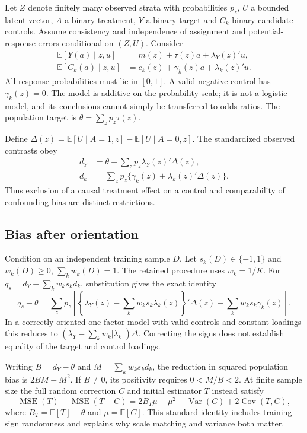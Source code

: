 \documentclass[11pt,a4paper]{article}
\newcommand{\E}{\mathbb E}
\newcommand{\Var}{\operatorname{Var}}
\newcommand{\Cov}{\operatorname{Cov}}
\newcommand{\MSE}{\operatorname{MSE}}
\begin{document}
Let $Z$ denote finitely many observed strata with probabilities $p_z$, $U$ a bounded latent vector, $A$ a binary treatment, $Y$ a binary target and $C_k$ binary candidate controls. Assume consistency and independence of assignment and potential-response errors conditional on $(Z,U)$. Consider
\begin{align}
 \E[Y(a)\mid z,u]&=m(z)+\tau(z)a+\lambda_Y(z)'u,\\
 \E[C_k(a)\mid z,u]&=c_k(z)+\gamma_k(z)a+\lambda_k(z)'u.
\end{align}
All response probabilities must lie in $[0,1]$. A valid negative control has $\gamma_k(z)=0$. The model is additive on the probability scale; it is not a logistic model, and its conclusions cannot simply be transferred to odds ratios. The population target is $\theta=\sum_zp_z\tau(z)$.

Define $\Delta(z)=\E[U\mid A=1,z]-\E[U\mid A=0,z]$. The standardized observed contrasts obey
\begin{align}
 d_Y&=\theta+\sum_zp_z\lambda_Y(z)'\Delta(z),\\
 d_k&=\sum_zp_z\{\gamma_k(z)+\lambda_k(z)'\Delta(z)\}.
\end{align}
Thus exclusion of a causal treatment effect on a control and comparability of confounding bias are distinct restrictions.

\subsection{Bias after orientation}

Condition on an independent training sample $D$. Let $s_k(D)\in\{-1,1\}$ and $w_k(D)\ge0$, $\sum_kw_k(D)=1$. The retained procedure uses $w_k=1/K$. For $q_s=d_Y-\sum_kw_ks_kd_k$, substitution gives the exact identity
\begin{equation}\label{eq:bias}
q_s-\theta=\sum_zp_z\left[\left\{\lambda_Y(z)-\sum_kw_ks_k\lambda_k(z)\right\}'\Delta(z)-\sum_kw_ks_k\gamma_k(z)\right].
\end{equation}
In a correctly oriented one-factor model with valid controls and constant loadings this reduces to $(\lambda_Y-\sum_kw_k|\lambda_k|)\Delta$. Correcting the signs does not establish equality of the target and control loadings.

Writing $B=d_Y-\theta$ and $M=\sum_kw_ks_kd_k$, the reduction in squared population bias is $2BM-M^2$. If $B\ne0$, its positivity requires $0<M/B<2$. At finite sample size the full random correction $C$ and initial estimator $T$ instead satisfy
\begin{equation}
\MSE(T)-\MSE(T-C)=2B_T\mu-\mu^2-\Var(C)+2\Cov(T,C),
\end{equation}
where $B_T=\E[T]-\theta$ and $\mu=\E[C]$. This standard identity includes training-sign randomness and explains why scale matching and variance both matter.
\end{document}
